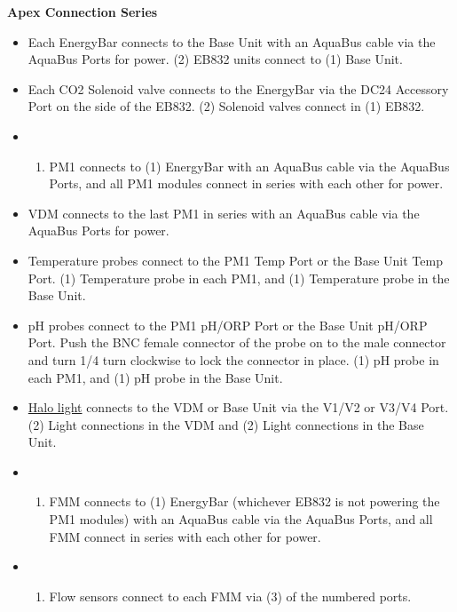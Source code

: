 \documentclass[]{book}
\providecommand{\tightlist}{%
  \setlength{\itemsep}{0pt}\setlength{\parskip}{0pt}}
\begin{document}
 \textbf{Apex Connection Series}

\begin{itemize}
\item
  Each EnergyBar connects to the Base Unit with an AquaBus cable via the
  AquaBus Ports for power. (2) EB832 units connect to (1) Base Unit.\\
\item
  Each CO2 Solenoid valve connects to the EnergyBar via the DC24
  Accessory Port on the side of the EB832. (2) Solenoid valves connect
  in (1) EB832.\\
\item
  \begin{enumerate}
  \def\labelenumi{(\arabic{enumi})}
  \tightlist
  \item
    PM1 connects to (1) EnergyBar with an AquaBus cable via the AquaBus
    Ports, and all PM1 modules connect in series with each other for
    power.\\
  \end{enumerate}
\item
  VDM connects to the last PM1 in series with an AquaBus cable via the
  AquaBus Ports for power.\\
\item
  Temperature probes connect to the PM1 Temp Port or the Base Unit Temp
  Port. (1) Temperature probe in each PM1, and (1) Temperature probe in
  the Base Unit.\\
\item
  pH probes connect to the PM1 pH/ORP Port or the Base Unit pH/ORP Port.
  Push the BNC female connector of the probe on to the male connector
  and turn 1/4 turn clockwise to lock the connector in place. (1) pH
  probe in each PM1, and (1) pH probe in the Base Unit.\\
\item
  \href{https://github.com/SilbigerLab/Mesocosm_User_Manual/tree/394a3f7d9fed8765e4152f9fdd11d00a2ea87a93/Manuals/HALO_Quick_Start_Guide.pdf}{Halo
  light} connects to the VDM or Base Unit via the V1/V2 or V3/V4 Port.
  (2) Light connections in the VDM and (2) Light connections in the Base
  Unit.\\
\item
  \begin{enumerate}
  \def\labelenumi{(\arabic{enumi})}
  \tightlist
  \item
    FMM connects to (1) EnergyBar (whichever EB832 is not powering the
    PM1 modules) with an AquaBus cable via the AquaBus Ports, and all
    FMM connect in series with each other for power.\\
  \end{enumerate}
\item
  \begin{enumerate}
  \def\labelenumi{(\arabic{enumi})}
  \setcounter{enumi}{2}
  \tightlist
  \item
    Flow sensors connect to each FMM via (3) of the numbered ports.
  \end{enumerate}
\end{itemize}
\end{document}
